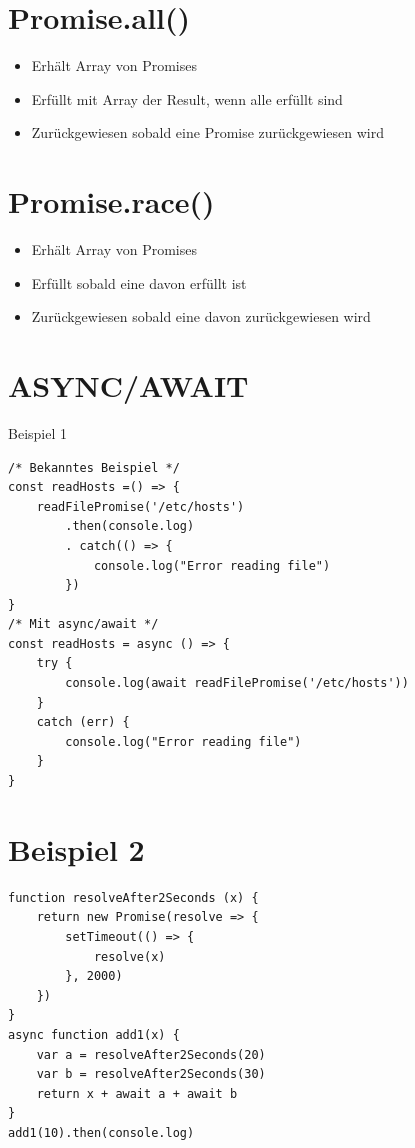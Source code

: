 \documentclass[10pt]{article}
\begin{document}
\section*{Promise.all()}
\begin{itemize}
  \item Erhält Array von Promises
  \item Erfüllt mit Array der Result, wenn alle erfüllt sind
  \item Zurückgewiesen sobald eine Promise zurückgewiesen wird
\end{itemize}

\section*{Promise.race()}
\begin{itemize}
  \item Erhält Array von Promises
  \item Erfüllt sobald eine davon erfüllt ist
  \item Zurückgewiesen sobald eine davon zurückgewiesen wird
\end{itemize}

\section*{ASYNC/AWAIT}
Beispiel 1

\begin{verbatim}
/* Bekanntes Beispiel */
const readHosts =() => {
    readFilePromise('/etc/hosts')
        .then(console.log)
        . catch(() => {
            console.log("Error reading file")
        })
}
/* Mit async/await */
const readHosts = async () => {
    try {
        console.log(await readFilePromise('/etc/hosts'))
    }
    catch (err) {
        console.log("Error reading file")
    }
}
\end{verbatim}

\section*{Beispiel 2}
\begin{verbatim}
function resolveAfter2Seconds (x) {
    return new Promise(resolve => {
        setTimeout(() => {
            resolve(x)
        }, 2000)
    })
}
async function add1(x) {
    var a = resolveAfter2Seconds(20)
    var b = resolveAfter2Seconds(30)
    return x + await a + await b
}
add1(10).then(console.log)
\end{verbatim}
\end{document}
